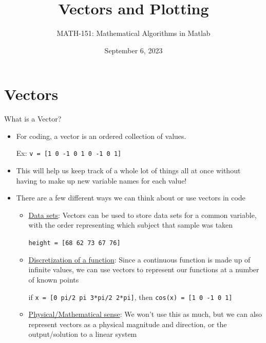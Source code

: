 {}\documentclass[letterpaper,
compress,
xcolor=x11names,
]{beamer}
\begin{document}
	\title{Vectors and Plotting}
	\author{MATH-151:  Mathematical Algorithms in Matlab}
	\date[202X]{September 6, 2023}




\begin{frame}
\titlepage
\end{frame}
\section{Vectors}

\begin{frame}{What is a Vector?}
	\footnotesize
	\begin{itemize}
		\item For coding, a vector is an ordered collection of values.
		\begin{center}
			Ex: \texttt{v = [1 0 -1 0 1 0 -1 0 1]}
		\end{center}
		\item This will help us keep track of a whole lot of things all at once without having to make up new variable names for each value!
		\item<2-> There are a few different ways we can think about or use vectors in code
		\begin{itemize}
			\item<2-> \underline{Data sets}: Vectors can be used to store data sets for a common variable, with the order representing which subject that sample was taken
			\begin{center}
				\texttt{height = [68 62 73 67 76]}
			\end{center}
			\item<3-> \underline{Discretization of a function}: Since a continuous function is made up of infinite values, we can use vectors to represent our functions at a number of known points
			\begin{center}
				if \texttt{x = [0 pi/2 pi 3*pi/2 2*pi]}, then \texttt{cos(x) = [1 0 -1 0 1]}
			\end{center}
			\item<4-> \underline{Physical/Mathematical sense}: We won't use this as much, but we can also represent vectors as a physical magnitude and direction, or the output/solution to a linear system
		\end{itemize}
	\end{itemize}
\end{frame}
\end{document}
